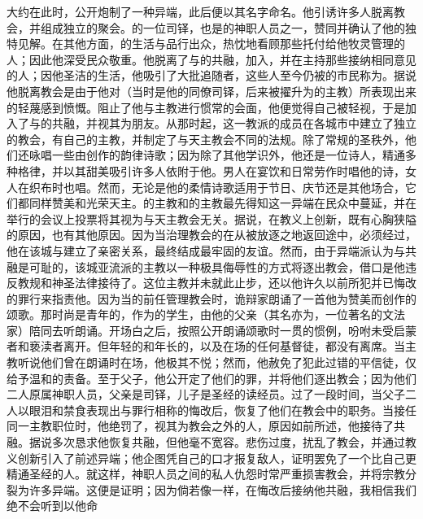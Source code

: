 大约在此时，公开炮制了一种异端，此后便以其名字命名。他引诱许多人脱离教会，并组成独立的聚会。的一位司铎，也是的神职人员之一，赞同并确认了他的独特见解。在其他方面，的生活与品行出众，热忱地看顾那些托付给他牧灵管理的人；因此他深受民众敬重。他脱离了与的共融，加入，并在主持那些接纳相同意见的人；因他圣洁的生活，他吸引了大批追随者，这些人至今仍被的市民称为。据说他脱离教会是由于他对（当时是他的同僚司铎，后来被擢升为的主教）所表现出来的轻蔑感到愤慨。阻止了他与主教进行惯常的会面，他便觉得自己被轻视，于是加入了与的共融，并视其为朋友。从那时起，这一教派的成员在各城市中建立了独立的教会，有自己的主教，并制定了与天主教会不同的法规。除了常规的圣秩外，他们还咏唱一些由创作的韵律诗歌；因为除了其他学识外，他还是一位诗人，精通多种格律，并以其甜美吸引许多人依附于他。男人在宴饮和日常劳作时唱他的诗，女人在织布时也唱。然而，无论是他的柔情诗歌适用于节日、庆节还是其他场合，它们都同样赞美和光荣天主。的主教和的主教最先得知这一异端在民众中蔓延，并在举行的会议上投票将其视为与天主教会无关。据说，在教义上创新，既有心胸狭隘的原因，也有其他原因。因为当治理教会的在从被放逐之地返回途中，必须经过，他在该城与建立了亲密关系，最终结成最牢固的友谊。然而，由于异端派认为与共融是可耻的，该城亚流派的主教以一种极具侮辱性的方式将逐出教会，借口是他违反教规和神圣法律接待了。这位主教并未就此止步，还以他许久以前所犯并已悔改的罪行来指责他。因为当的前任管理教会时，诡辩家朗诵了一首他为赞美而创作的颂歌。那时尚是青年的，作为的学生，由他的父亲（其名亦为，一位著名的文法家）陪同去听朗诵。开场白之后，按照公开朗诵颂歌时一贯的惯例，吩咐未受启蒙者和亵渎者离开。但年轻的和年长的，以及在场的任何基督徒，都没有离席。当主教听说他们曾在朗诵时在场，他极其不悦；然而，他赦免了犯此过错的平信徒，仅给予温和的责备。至于父子，他公开定了他们的罪，并将他们逐出教会；因为他们二人原属神职人员，父亲是司铎，儿子是圣经的读经员。过了一段时间，当父子二人以眼泪和禁食表现出与罪行相称的悔改后，恢复了他们在教会中的职务。当接任同一主教职位时，他绝罚了，视其为教会之外的人，原因如前所述，他接待了共融。据说多次恳求他恢复共融，但他毫不宽容。悲伤过度，扰乱了教会，并通过教义创新引入了前述异端；他企图凭自己的口才报复敌人，证明罢免了一个比自己更精通圣经的人。就这样，神职人员之间的私人仇怨时常严重损害教会，并将宗教分裂为许多异端。这便是证明；因为倘若像一样，在悔改后接纳他共融，我相信我们绝不会听到以他命